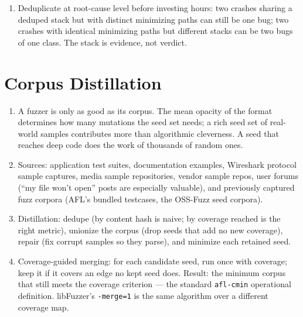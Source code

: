 \documentclass[12pt]{Training}
\begin{document}
\begin{enumerate}
	\begin{enumerate}
		\item Controlled-length, controlled-content write inside a large heap region: scheduler-compatible, near-certainly exploitable (it satisfies the ideal heap vulnerability qualities: control of the allocation size, the overflowed data, and the overflow length).
		\item Controlled target address: near-arbitrary write, exploitable modulo CFI.
		\item Uncontrolled-length overflow (long memcpy): trivially DoS, exploitable only if a same/adjacent-size object has interesting metadata.
		\item Hang/overtime/slow-alloc: usually quality-of-life issues only, unless it models a resource-exhaustion primitive on a protocol-adjacent target.
		\item Check the call site of the corruption \emph{and} the crash frame: ASan reports the first faulting access, not the bug. A UAF read in \lstinline{strcmp} may be the shadow of a double-free bug set up two frames earlier.
	\end{enumerate}
	\item Deduplicate at root-cause level before investing hours: two crashes sharing a deduped stack but with distinct minimizing paths can still be one bug; two crashes with identical minimizing paths but different stacks can be two bugs of one class. The stack is evidence, not verdict.
\end{enumerate}

\section*{Corpus Distillation}
\begin{enumerate}
	\item A fuzzer is only as good as its corpus. The mean opacity of the format determines how many mutations the seed set needs; a rich seed set of real-world samples contributes more than algorithmic cleverness. A seed that reaches deep code does the work of thousands of random ones.
	\item Sources: application test suites, documentation examples, Wireshark protocol sample captures, media sample repositories, vendor sample repos, user forums (``my file won't open'' posts are especially valuable), and previously captured fuzz corpora (AFL's bundled testcases, the OSS-Fuzz seed corpora).
	\item Distillation: dedupe (by content hash is naive; by coverage reached is the right metric), unionize the corpus (drop seeds that add no new coverage), repair (fix corrupt samples so they parse), and minimize each retained seed.
	\item Coverage-guided merging: for each candidate seed, run once with coverage; keep it if it covers an edge no kept seed does. Result: the minimum corpus that still meets the coverage criterion --- the standard \lstinline{afl-cmin} operational definition. libFuzzer's \lstinline{-merge=1} is the same algorithm over a different coverage map.
\end{enumerate}
\end{document}
